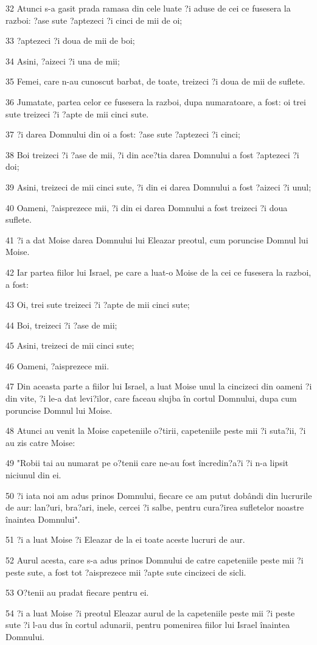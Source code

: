 \par 32 Atunci s-a gasit prada ramasa din cele luate ?i aduse de cei ce fusesera la razboi: ?ase sute ?aptezeci ?i cinci de mii de oi;
\par 33 ?aptezeci ?i doua de mii de boi;
\par 34 Asini, ?aizeci ?i una de mii;
\par 35 Femei, care n-au cunoscut barbat, de toate, treizeci ?i doua de mii de suflete.
\par 36 Jumatate, partea celor ce fusesera la razboi, dupa numaratoare, a fost: oi trei sute treizeci ?i ?apte de mii cinci sute.
\par 37 ?i darea Domnului din oi a fost: ?ase sute ?aptezeci ?i cinci;
\par 38 Boi treizeci ?i ?ase de mii, ?i din ace?tia darea Domnului a fost ?aptezeci ?i doi;
\par 39 Asini, treizeci de mii cinci sute, ?i din ei darea Domnului a fost ?aizeci ?i unul;
\par 40 Oameni, ?aisprezece mii, ?i din ei darea Domnului a fost treizeci ?i doua suflete.
\par 41 ?i a dat Moise darea Domnului lui Eleazar preotul, cum poruncise Domnul lui Moise.
\par 42 Iar partea fiilor lui Israel, pe care a luat-o Moise de la cei ce fusesera la razboi, a fost:
\par 43 Oi, trei sute treizeci ?i ?apte de mii cinci sute;
\par 44 Boi, treizeci ?i ?ase de mii;
\par 45 Asini, treizeci de mii cinci sute;
\par 46 Oameni, ?aisprezece mii.
\par 47 Din aceasta parte a fiilor lui Israel, a luat Moise unul la cincizeci din oameni ?i din vite, ?i le-a dat levi?ilor, care faceau slujba în cortul Domnului, dupa cum poruncise Domnul lui Moise.
\par 48 Atunci au venit la Moise capeteniile o?tirii, capeteniile peste mii ?i suta?ii, ?i au zis catre Moise:
\par 49 "Robii tai au numarat pe o?tenii care ne-au fost încredin?a?i ?i n-a lipsit niciunul din ei.
\par 50 ?i iata noi am adus prinos Domnului, fiecare ce am putut dobândi din lucrurile de aur: lan?uri, bra?ari, inele, cercei ?i salbe, pentru cura?irea sufletelor noastre înaintea Domnului".
\par 51 ?i a luat Moise ?i Eleazar de la ei toate aceste lucruri de aur.
\par 52 Aurul acesta, care s-a adus prinos Domnului de catre capeteniile peste mii ?i peste sute, a fost tot ?aisprezece mii ?apte sute cincizeci de sicli.
\par 53 O?tenii au pradat fiecare pentru ei.
\par 54 ?i a luat Moise ?i preotul Eleazar aurul de la capeteniile peste mii ?i peste sute ?i l-au dus în cortul adunarii, pentru pomenirea fiilor lui Israel înaintea Domnului.

